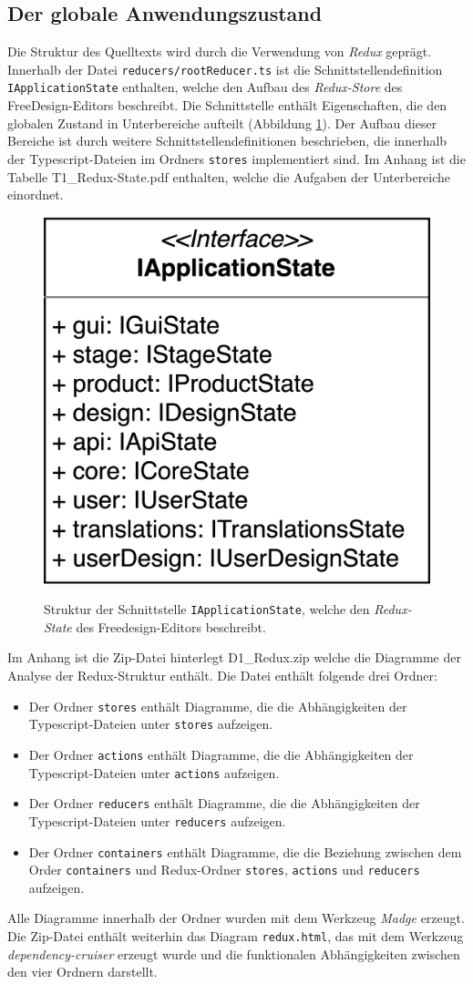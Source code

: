 \subsection{Der globale Anwendungszustand}
Die Struktur des Quelltexts wird durch die Verwendung von \emph{Redux} geprägt. Innerhalb der Datei \lstinline|reducers/rootReducer.ts| ist die Schnittstellendefinition \lstinline|IApplicationState| enthalten, welche den Aufbau des \emph{Redux-Store} des FreeDesign-Editors beschreibt. Die Schnittstelle enthält Eigenschaften, die den globalen Zustand in Unterbereiche aufteilt (Abbildung \ref{fig:IApplicationState}). Der Aufbau dieser Bereiche ist durch weitere Schnittstellendefinitionen beschrieben, die innerhalb der Typescript-Dateien im Ordners \lstinline|stores| implementiert sind. 
Im Anhang ist die Tabelle T1\_Redux-State.pdf enthalten, welche die Aufgaben der Unterbereiche einordnet. 


\begin{figure}[H]
    \centering
    \caption{Struktur der Schnittstelle \lstinline|IApplicationState|, welche den \emph{Redux-State} des Freedesign-Editors beschreibt.}
    \includegraphics[width=.3\textwidth]{diagrams/Ist-Architektur/IApplicationState.png}
    \label{fig:IApplicationState}
\end{figure}


Im Anhang ist die Zip-Datei hinterlegt D1\_Redux.zip welche die Diagramme der Analyse der Redux-Struktur enthält.
Die Datei enthält folgende drei Ordner:  
\begin{itemize}
    \item Der Ordner \lstinline|stores| enthält Diagramme, die die Abhängigkeiten der Typescript-Dateien unter \lstinline|stores| aufzeigen.
    \item Der Ordner \lstinline|actions| enthält Diagramme, die die Abhängigkeiten der Typescript-Dateien unter \lstinline|actions| aufzeigen.
    \item Der Ordner \lstinline|reducers| enthält Diagramme, die die Abhängigkeiten der Typescript-Dateien unter \lstinline|reducers| aufzeigen. 
    \item Der Ordner \lstinline|containers| enthält Diagramme, die die Beziehung zwischen dem Order \lstinline|containers| und Redux-Ordner \lstinline|stores|, \lstinline|actions| und \lstinline|reducers| aufzeigen.
\end{itemize}
Alle Diagramme innerhalb der Ordner wurden mit dem Werkzeug \emph{Madge} erzeugt.
Die Zip-Datei enthält weiterhin das Diagram \lstinline|redux.html|, das mit dem Werkzeug \emph{dependency-cruiser} erzeugt wurde und die funktionalen Abhängigkeiten zwischen den vier Ordnern darstellt.

